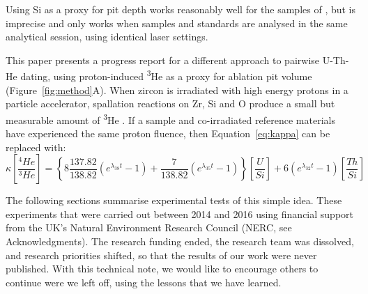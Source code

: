 \documentclass{article}
\begin{document}
Using Si as a proxy for pit depth works reasonably well for the
samples of \citet{vermeesch2012a}, but is imprecise and only works
when samples and standards are analysed in the same analytical
session, using identical laser settings.\medskip

This paper presents a progress report for a different approach to
pairwise U-Th-He dating, using proton-induced \textsuperscript{3}He as
a proxy for ablation pit volume (Figure~\ref{fig:method}A). When
zircon is irradiated with high energy protons in a particle
accelerator, spallation reactions on Zr, Si and O produce a small but
measurable amount of \textsuperscript{3}He \citep{shuster2004}. If a
sample and co-irradiated reference materials have experienced the same
proton fluence, then Equation~\ref{eq:kappa} can be replaced with:
\begin{equation}
  \kappa \left[\frac{{}^{4}He}{{}^{3}He}\right] =
  \left\{
  8 \frac{137.82}{138.82} \left(e^{\lambda_{38}t}-1\right)  +
  \frac{7}{138.82} \left(e^{\lambda_{35}t}-1\right) 
  \right\} \left[\frac{U}{Si}\right] +
  6 \left(e^{\lambda_{32}t}-1\right) \left[\frac{Th}{Si}\right]
  \label{eq:kappa43}
\end{equation}

The following sections summarise experimental tests of this simple
idea.  These experiments that were carried out between 2014 and 2016
using financial support from the UK's Natural Environment Research
Council (NERC, see Acknowledgments).  The research funding ended, the
research team was dissolved, and research priorities shifted, so that
the results of our work were never published. With this technical
note, we would like to encourage others to continue were we left off,
using the lessons that we have learned.\medskip
\end{document}
